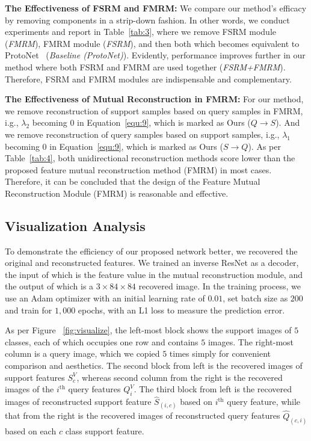 \documentclass[letterpaper]{article} %
\begin{document}
\textbf{The Effectiveness of FSRM and FMRM:} We compare our method's efficacy by removing components in a strip-down fashion. In other words, we conduct experiments and report in Table~\ref{tab:3}, where we remove FSRM module (\textit{FMRM}), FMRM module (\textit{FSRM}), and then both which becomes equivalent to ProtoNet~\cite{NIPS2017_cb8da676} (\textit{Baseline (ProtoNet)}).
{Evidently, performance improves further in our method where both FSRM and FMRM are used together (\textit{FSRM+FMRM}). Therefore, FSRM and FMRM modules are indispensable and complementary.}



\textbf{The Effectiveness of Mutual Reconstruction in FMRM:}
For our method, we remove reconstruction of support samples based on query samples in FMRM, i.g., $\lambda_2$ becoming $0$ in Equation~\ref{equ:9}, which is marked as Ours ($Q \to S$). And we remove reconstruction of query samples based on support samples, i.g., $\lambda_1$ becoming $0$ in Equation~\ref{equ:9}, which is marked as Ours ($S\to Q$).
{As per Table~\ref{tab:4}, both unidirectional reconstruction methods score lower than the proposed feature mutual reconstruction method (FMRM) in most cases. Therefore, it can be concluded that the design of the Feature Mutual Reconstruction Module (FMRM) is reasonable and effective.}










\subsection{Visualization Analysis}


To demonstrate the efficiency of our proposed network better, we recovered the original and reconstructed features. We trained an inverse ResNet as a decoder, the input of which is the feature value in the mutual reconstruction module, and the output of which is a $3 \times 84 \times 84$ recovered image. In the training process, we use an Adam optimizer with an initial learning rate of $0.01$, set batch size as $200$ and train for $1,000$ epochs, with an L1 loss to measure the prediction error.


As per Figure ~\ref{fig:visualize}, the left-most block shows the support images of $5$ classes, each of which occupies one row and contains $5$ images. The right-most column is a query image, which we copied $5$ times simply for convenient comparison and aesthetics.
The second block from left is the recovered images of support features $S_c^V$, whereas second column from the right is the recovered images of the $i^\text{th}$ query features $Q_i^V$.
The third block from left is the recovered images of reconstructed support feature $\hat{S}_{(i,c)}$ based on $i^\text{th}$ query feature, while that from the right is the recovered images of reconstructed query features $\hat{Q}_{(c,i)}$ based on each $c$ class support feature.
\end{document}
